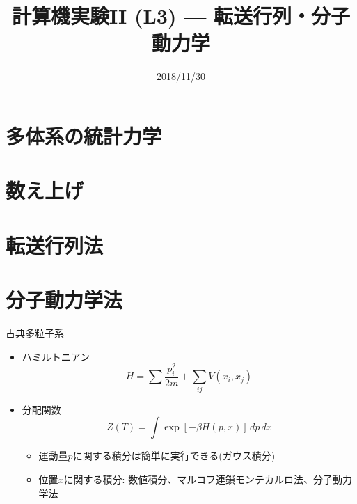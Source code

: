 \documentclass[dvipdfmx]{beamer}
\title{計算機実験II (L3) --- 転送行列・分子動力学}
\date{2018/11/30}
\begin{document}
\begin{frame}
  \titlepage
  \tableofcontents
\end{frame}

\section{多体系の統計力学}






\section{数え上げ}




\section{転送行列法}













\section{分子動力学法}

\begin{frame}[t,fragile]{古典多粒子系}
  \begin{itemize}
    \setlength{\itemsep}{1em}
  \item ハミルトニアン
    \[
    H = \sum \frac{p_i^2}{2m} + \sum_{ij} V(x_i, x_j)
    \]
  \item 分配関数
    \[
    Z(T) = \int \exp [- \beta H(p,x) ] \, dp \, dx
    \]
    \begin{itemize}
    \item 運動量$p$に関する積分は簡単に実行できる(ガウス積分)
    \item 位置$x$に関する積分: 数値積分、マルコフ連鎖モンテカルロ法、分子動力学法
    \end{itemize}
  \end{itemize}
\end{frame}
\end{document}
